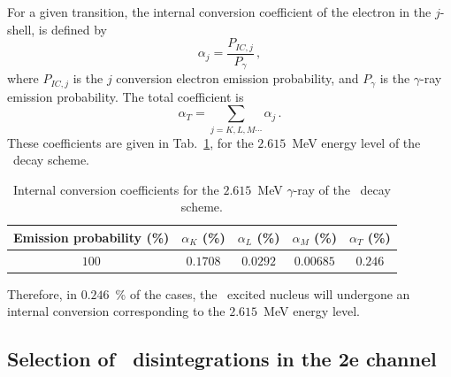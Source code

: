 For a given transition, the internal conversion coefficient of the electron in the $j$-shell, is defined by
\begin{equation}
\alpha_{j}=\frac{P_{IC, j}}{P_{\gamma}}\,,
\end{equation}
where $P_{IC,j}$ is the $j$ conversion electron emission probability, and $P_{\gamma}$ is the $\gamma$-ray emission probability.
The total coefficient is
\begin{equation}
  \alpha_{T}=\sum_{j=K,L,M\cdots}\alpha_{j}\,.
\end{equation}
These coefficients are given in Tab.~\ref{tab:IC_prob}, for the $2.615$~MeV energy level of the \Tl\ decay scheme.
\begin{table}[!h]
  \centering
  \begin{tabular}{|c|c|c|c|c|}
    \hline
    Emission probability (\%) & $\alpha_{K}$ (\%) & $\alpha_{L}$ (\%) & $\alpha_{M}$ (\%) & $\alpha_{T}$ (\%) \\
    \hline\hline
    $100$ & $0.1708$ &    $0.0292$ &  $0.00685$  &    $0.246$ \\
    \hline
  \end{tabular}
  \caption{Internal conversion coefficients for the $2.615$~MeV $\gamma$-ray of the \Tl\ decay scheme.
    \label{tab:IC_prob}}
\end{table}
Therefore, in $0.246$~\% of the cases, the \Pb\ excited nucleus will undergone an internal conversion corresponding to the $2.615$~MeV energy level.


\subsection{Selection of \Tl\ disintegrations in the 2e channel}

